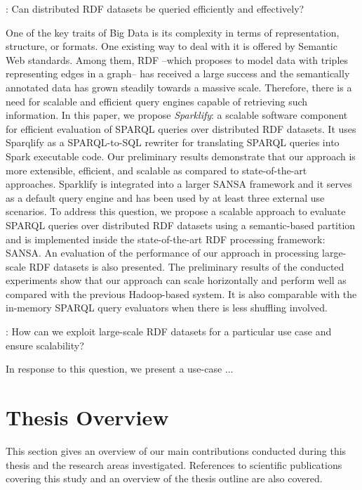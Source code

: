 \begin{tcolorbox}
\textbf{\rqNr[RQ3]\label{rq:3}}: Can distributed RDF datasets be queried efficiently and effectively?
\end{tcolorbox}

One of the key traits of Big Data is its complexity in terms of representation, structure, or formats.
One existing way to deal with it is offered by Semantic Web standards.
Among them, \gls{RDF} --which proposes to model data with triples representing edges in a graph-- has received a large success and the semantically annotated data has grown steadily towards a massive scale.
Therefore, there is a need for scalable and efficient query engines capable of retrieving such information.
In this paper, we propose \emph{Sparklify}: a scalable software component for efficient evaluation of SPARQL queries over distributed RDF datasets. It uses Sparqlify as a SPARQL-to-SQL rewriter for translating SPARQL queries into Spark executable code.
Our preliminary results demonstrate that our approach is more extensible, efficient, and scalable as compared to state-of-the-art approaches.
Sparklify is integrated into a larger SANSA framework and it serves as a default query engine and has been used by at least three external use scenarios.
To address this question, we propose a scalable approach to evaluate SPARQL queries over distributed RDF datasets using a semantic-based partition and is implemented inside the state-of-the-art \gls{RDF} processing framework: SANSA.
An evaluation of the performance of our approach in processing large-scale RDF datasets is also presented. 
The preliminary results of the conducted experiments show that our approach can scale horizontally and perform well as compared with the previous Hadoop-based system.
It is also comparable with the in-memory SPARQL query evaluators when there is less shuffling involved.


\begin{tcolorbox}
\textbf{\rqNr[RQ4]\label{rq:4}}: How can we exploit large-scale RDF datasets for a particular use case and ensure scalability?
\end{tcolorbox}
In response to this question, we present a use-case ...


\section{Thesis Overview}
\label{sec:thesis-overview}
This section gives an overview of our main contributions conducted during this thesis and the research areas investigated.
References to scientific publications covering this study and an overview of the thesis outline are also covered.


